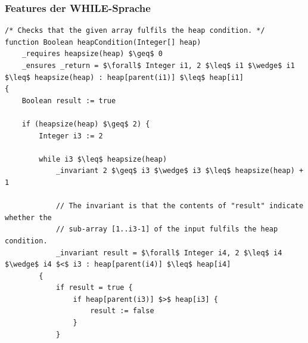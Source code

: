 \documentclass[t,svgnames]{beamer}
\begin{document}
\begin{frame}[fragile]
	\frametitle{Features der WHILE-Sprache}
	
	\begin{lstlisting}[frame=lines,mathescape=true]
/* Checks that the given array fulfils the heap condition. */
function Boolean heapCondition(Integer[] heap)
    _requires heapsize(heap) $\geq$ 0
    _ensures _return = $\forall$ Integer i1, 2 $\leq$ i1 $\wedge$ i1 $\leq$ heapsize(heap) : heap[parent(i1)] $\leq$ heap[i1]
{
    Boolean result := true
    
    if (heapsize(heap) $\geq$ 2) {
        Integer i3 := 2
        
        while i3 $\leq$ heapsize(heap)
            _invariant 2 $\geq$ i3 $\wedge$ i3 $\leq$ heapsize(heap) + 1
            
            // The invariant is that the contents of "result" indicate whether the
            // sub-array [1..i3-1] of the input fulfils the heap condition.
            _invariant result = $\forall$ Integer i4, 2 $\leq$ i4 $\wedge$ i4 $<$ i3 : heap[parent(i4)] $\leq$ heap[i4]
        {
            if result = true {
                if heap[parent(i3)] $>$ heap[i3] {
                    result := false
                }
            }
    \end{lstlisting}
\end{frame}
\end{document}

